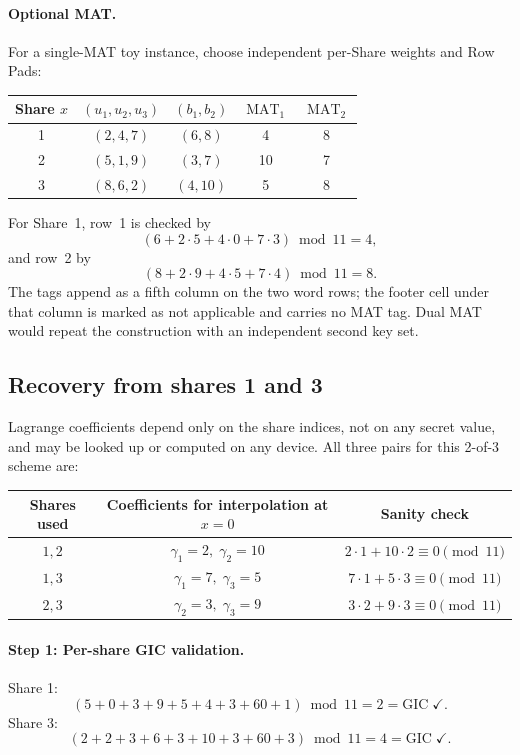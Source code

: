 \documentclass[11pt]{article}
\begin{document}
\paragraph{Optional MAT.} For a single-MAT toy instance, choose independent per-Share weights and Row Pads:
\begin{center}
\small
\begin{tabular}{@{}ccccc@{}}
\toprule
Share $x$ & $(u_1,u_2,u_3)$ & $(b_1,b_2)$ & $\operatorname{MAT}_1$ & $\operatorname{MAT}_2$ \\ \midrule
1 & $(2,4,7)$ & $(6,8)$ & 4 & 8 \\
2 & $(5,1,9)$ & $(3,7)$ & 10 & 7 \\
3 & $(8,6,2)$ & $(4,10)$ & 5 & 8 \\
\bottomrule
\end{tabular}
\end{center}
For Share~1, row~1 is checked by
\[
    (6+2\cdot5+4\cdot0+7\cdot3)\bmod11=4,
\]
and row~2 by
\[
    (8+2\cdot9+4\cdot5+7\cdot4)\bmod11=8.
\]
The tags append as a fifth column on the two word rows; the footer cell under that column is marked as not applicable and carries no MAT tag. Dual MAT would repeat the construction with an independent second key set.

\subsection{Recovery from shares 1 and 3}

Lagrange coefficients depend only on the share indices, not on any secret value, and may be looked up or computed on any device. All three pairs for this 2-of-3 scheme are:
\begin{center}
\small
\begin{tabular}{@{}ccc@{}}
\toprule
Shares used & Coefficients for interpolation at $x=0$ & Sanity check \\ \midrule
$1,2$ & $\gamma_1 = 2,\; \gamma_2 = 10$ & $2\cdot1 + 10\cdot2 \equiv 0 \pmod{11}$ \\
$1,3$ & $\gamma_1 = 7,\; \gamma_3 = 5$ & $7\cdot1 + 5\cdot3 \equiv 0 \pmod{11}$ \\
$2,3$ & $\gamma_2 = 3,\; \gamma_3 = 9$ & $3\cdot2 + 9\cdot3 \equiv 0 \pmod{11}$ \\
\bottomrule
\end{tabular}
\end{center}

\paragraph{Step 1: Per-share GIC validation.}
Share 1:
\[
(5{+}0{+}3{+}9{+}5{+}4{+}3{+}60{+}1) \bmod 11 = 2 = \text{GIC} \;\checkmark.
\]
Share 3:
\[
(2{+}2{+}3{+}6{+}3{+}10{+}3{+}60{+}3) \bmod 11 = 4 = \text{GIC} \;\checkmark.
\]
\end{document}
